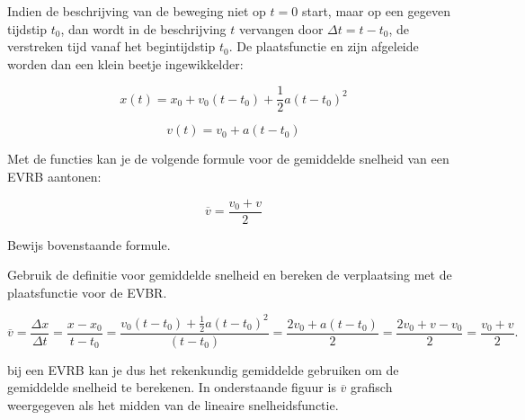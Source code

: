 \documentclass{ximera}
\begin{document}
Indien de beschrijving van de beweging niet op $t=0$ start, maar op een gegeven tijdstip $t_0$, dan wordt in de beschrijving $t$ vervangen door $\Delta t= t-t_0$, de verstreken tijd vanaf het begintijdstip $t_0$. De plaatsfunctie en zijn afgeleide worden dan een klein beetje ingewikkelder:

\[
x(t) = x_0+v_0(t-t_0)+\frac{1}{2}a(t-t_0)^2
\]

\[
v(t) = v_0+a(t-t_0)
\]

Met de functies kan je de volgende formule voor de gemiddelde snelheid van een EVRB aantonen:


\[
\overline{v}=\frac{v_0+v}{2}
\]
	
\begin{exercise}
Bewijs bovenstaande formule. 

\begin{hint}
Gebruik de definitie voor gemiddelde snelheid en bereken de verplaatsing met de plaatsfunctie voor de EVBR. 
\end{hint}

\begin{oplossing}
	\[
	\overline{v}=\frac{\Delta x}{\Delta t}=\frac{x-x_0}{t-t_0} = \frac{v_0(t-t_0)+\frac{1}{2}a(t-t_0)^2}{(t-t_0)} = \frac{2v_0+a(t-t_0)}{2} = \frac{2v_0 + v - v_0}{2} = \frac{v_0+v}{2}.
	\]
		
	bij een EVRB kan je dus het rekenkundig gemiddelde gebruiken om de gemiddelde snelheid te berekenen. 
	In onderstaande figuur is \(\overline{v}\) grafisch weergegeven als het midden van de lineaire snelheidsfunctie. 

	\begin{image}
	\end{image}

\end{oplossing}

	
\end{exercise}










	
	
\end{document}
